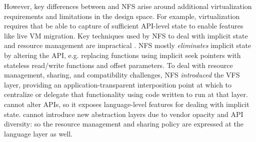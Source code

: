 {However, key differences between \model and NFS arise around additional virtualization requirements and
limitations in the design space.
For example, virtualization requires that \model be able to capture of
sufficient API-level state to enable features like live VM migration.
Key techniques used by NFS to deal with implicit state and
resource management are impractical \model.
NFS mostly \emph{eliminates} implicit state by altering the API,
e.g. replacing functions using implicit seek pointers with stateless read/write functions and offset parameters.
To deal with resource management, sharing, and compatibility challenges,
NFS \emph{introduced} the VFS layer, providing
an application-transparent interposition point at which to centralize or delegate that functionality using code written
to run at that layer. \model cannot alter APIs, so it exposes language-level features for dealing with implicit state.
\model cannot introduce new abstraction layers due to vendor opacity and API diversity: so the
resource management and sharing policy are expressed at the language layer as well.



}
